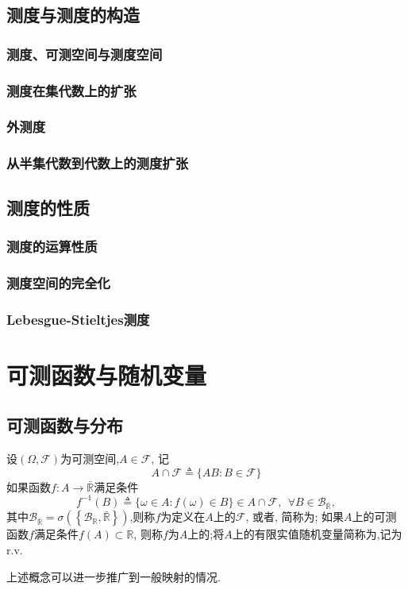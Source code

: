 \section{测度与测度的构造}
\subsection{测度、可测空间与测度空间}
\subsection{测度在集代数上的扩张}
\subsection{外测度}
\subsection{从半集代数到代数上的测度扩张}

\section{测度的性质}
\subsection{测度的运算性质}
\subsection{测度空间的完全化}
\subsection{Lebesgue-Stieltjes测度}



\chapter{可测函数与随机变量}
\section{可测函数与分布}


\begin{definition}
	设$(\Omega,\mathscr{F})$为可测空间,$A\in\mathscr{F}$, 记\begin{equation}
	A\cap \mathscr{F}\triangleq \{ AB:B\in\mathscr{F} \}
	\end{equation}
	如果函数$f:A\to\bar{\mathbb{R}}$满足条件\begin{equation}
	f^{-1}(B) \triangleq \{\omega\in A:f(\omega)\in B\}\in A\cap\mathscr{F},~~\forall B\in\mathscr{B}_{\bar{\mathbb{R}}},
	\end{equation}
	其中$\mathscr{B}_{\bar{\mathbb{R}}} = \sigma\left(\left\{\mathscr{B}_{\mathbb{R}},\bar{\mathbb{R}}\right\}\right)$,则称$f$为定义在$A$上的$\mathscr{F}$, 或者, 简称为; 如果$A$上的可测函数$f$满足条件$f(A)\subset \mathbb{R}$, 则称$f$为$A$上的;将$A$上的有限实值随机变量简称为,记为r.v.
\end{definition}
上述概念可以进一步推广到一般映射的情况.

